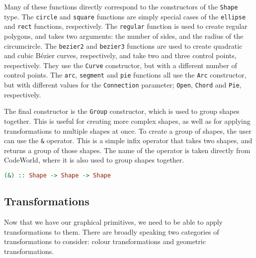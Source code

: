 \documentclass[../main.tex]{subfiles}
\begin{document}
                Many of these functions directly correspond to the constructors of the
                    \verb|Shape| type.
                The \verb|circle| and \verb|square| functions are simply special cases of the
                    \verb|ellipse| and \verb|rect| functions, respectively.
                The \verb|regular| function is used to create regular polygons, and takes two
                    arguments: the number of sides, and the radius of the circumcircle.
                The \verb|bezier2| and \verb|bezier3| functions are used to create quadratic
                    and cubic Bézier curves, respectively, and take two and three control points,
                    respectively.
                They use the \verb|Curve| constructor, but with a different number of control
                    points.
                The \verb|arc|, \verb|segment| and \verb|pie| functions all use the \verb|Arc|
                    constructor, but with different values for the \verb|Connection| parameter;
                    \verb|Open|, \verb|Chord| and \verb|Pie|, respectively.

                The final constructor is the \verb|Group| constructor, which is used to group
                    shapes together.
                This is useful for creating more complex shapes, as well as for applying
                    transformations to multiple shapes at once.
                To create a group of shapes, the user can use the \verb|&| operator.
                This is a simple infix operator that takes two shapes, and returns a group of
                    those shapes.
                The name of the operator is taken directly from CodeWorld, where it is also
                    used to group shapes together.

                \begin{lstlisting}[language=Haskell, label={lst:group}, morekeywords={Shape}, caption={The group operator.}]
(&) :: Shape -> Shape -> Shape\end{lstlisting}

        \subsection{Transformations}
            Now that we have our graphical primitives, we need to be able to apply
                transformations to them.
            There are broadly speaking two categories of transformations to consider:
                colour transformations and geometric transformations.
\end{document}
